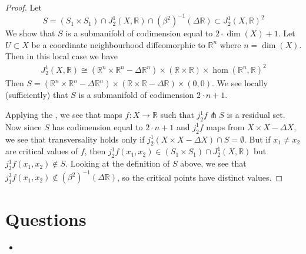 \documentclass[12pt]{article}
\newcommand{\RR}{\mathbb{R}}
\begin{document}
\begin{proof}
    Let 
    $$S = (S_1 \times S_1) \cap J^1_2(X, \RR) \cap (\beta^2)^{-1}(\Delta \RR) \subset J^1_2(X, \RR)^2$$
    We show that $S$ is a submanifold of codimension equal to $2\cdot \dim(X) + 1$. Let $U\subset X$ be a coordinate neighbourhood diffeomorphic to $\RR^n$ where $n = \dim(X)$. Then in this local case we have 
    \begin{align*}
        J^1_2(X, \RR) \cong (\RR^n \times \RR^n - \Delta \RR^n) \times (\RR \times \RR) \times \hom(\RR^n, \RR)^2
    \end{align*}
    Then $S = (\RR^n \times \RR^n - \Delta \RR^n) \times (\RR \times \RR - \Delta \RR) \times (0, 0)$. We see locally (sufficiently) that $S$ is a submanifold of codimension $2\cdot n + 1$. \par
    Applying the , we see that maps $f: X \to \RR$ such that $j^1_2 f \pitchfork S$ is a residual set. Now since $S$ has codimension equal to $2\cdot n + 1$ and $j^1_2 f$ maps from $X \times X - \Delta X$, we see that transversality holds only if $j^1_2(X\times X - \Delta X) \cap S = \emptyset$. But if $x_1 \neq x_2$ are critical values of $f$, then $j^1_2f (x_1, x_2) \in (S_1\times S_1) \cap J^1_2(X, \RR)$ but $j^1_2 f(x_1, x_2) \not \in S$. Looking at the definition of $S$ above, we see that $j^2_1 f(x_1, x_2) \not \in (\beta^2)^{-1}(\Delta \RR)$, so the critical points have distinct values.  
\end{proof}


\section{Questions}
\begin{itemize}
    \item 
\end{itemize}








\end{document}
